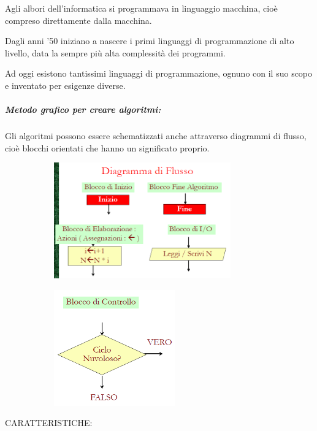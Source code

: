 \documentclass[
  paper=a4,
  oneside  ,captions=tableheading
]{scrbook}
\begin{document}
Agli albori dell'informatica si programmava in linguaggio macchina, cioè
compreso direttamente dalla macchina.

Dagli anni '50 iniziano a nascere i primi linguaggi di programmazione di
alto livello, data la sempre più alta complessità dei programmi.

Ad oggi esistono tantissimi linguaggi di programmazione, ognuno con il
suo scopo e inventato per esigenze diverse.

\hypertarget{metodo-grafico-per-creare-algoritmi}{%
\subparagraph{Metodo grafico per creare
algoritmi:}\label{metodo-grafico-per-creare-algoritmi}}

Gli algoritmi possono essere schematizzati anche attraverso diagrammi di
flusso, cioè blocchi orientati che hanno un significato proprio.

\begin{figure}[h]

\begin{subfigure}{0.5\textwidth}
\includegraphics[width=0.9\linewidth, height=5cm]{./image/image-20201111002115408.png} 
\end{subfigure}
\begin{subfigure}{0.5\textwidth}
\includegraphics[width=0.9\linewidth, height=5cm]{./image/image-20201111002130617.png}
\end{subfigure}
\end{figure}

CARATTERISTICHE:
\end{document}
